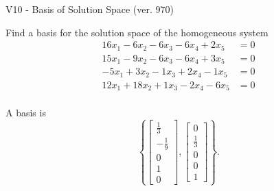 \begin{exercise}
  \begin{exerciseTitle}V10 - Basis of Solution Space (ver. 970)\end{exerciseTitle}
  \begin{exerciseStatement}
    Find a basis for the solution space of the homogeneous system 
\begin{align*}
 16 x_ 1 -6 x_ 2 -6 x_ 3 -6 x_ 4 + 2 x_ 5 &= 0  \\ 
  15 x_ 1 -9 x_ 2 -6 x_ 3 -6 x_ 4 + 3 x_ 5 &= 0  \\ 
  -5 x_ 1 + 3 x_ 2 -1 x_ 3 + 2 x_ 4 -1 x_ 5 &= 0  \\ 
  12 x_ 1 + 18 x_ 2 + 1 x_ 3 -2 x_ 4 -6 x_ 5 &= 0  \\ 
 \end{align*}


 
  \end{exerciseStatement}

  \begin{exerciseAnswer}
   A basis is   
\[\left\{\left[\begin{array}{c}
\frac{1}{3} \\
-\frac{1}{9} \\
0 \\
1 \\
0
\end{array}\right] , \left[\begin{array}{c}
0 \\
\frac{1}{3} \\
0 \\
0 \\
1
\end{array}\right]\right\}.\]

  


  \end{exerciseAnswer}
\end{exercise}